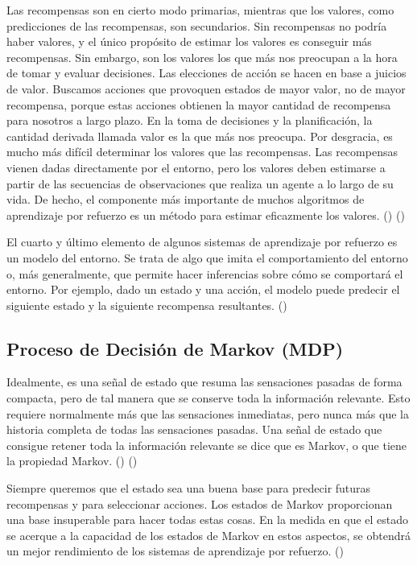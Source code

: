 Las recompensas son en cierto modo primarias, mientras que los valores, como predicciones de las recompensas, son secundarios. Sin recompensas no podría haber valores, y el único propósito de estimar los valores es conseguir más recompensas. Sin embargo, son los valores los que más nos preocupan a la hora de tomar y evaluar decisiones. Las elecciones de acción se hacen en base a juicios de valor. Buscamos acciones que provoquen estados de mayor valor, no de mayor recompensa, porque estas acciones obtienen la mayor cantidad de recompensa para nosotros a largo plazo. En la toma de decisiones y la planificación, la cantidad derivada llamada valor es la que más nos preocupa. Por desgracia, es mucho más difícil determinar los valores que las recompensas. Las recompensas vienen dadas directamente por el entorno, pero los valores deben estimarse a partir de las secuencias de observaciones que realiza un agente a lo largo de su vida. De hecho, el componente más importante de muchos algoritmos de aprendizaje por refuerzo es un método para estimar eficazmente los valores. (\cite{sutton1998introduction}) (\cite{rao2000reinforcement})

El cuarto y último elemento de algunos sistemas de aprendizaje por refuerzo es un modelo del entorno. Se trata de algo que imita el comportamiento del entorno o, más generalmente, que permite hacer inferencias sobre cómo se comportará el entorno. Por ejemplo, dado un estado y una acción, el modelo puede predecir el siguiente estado y la siguiente recompensa resultantes. (\cite{sutton1998introduction})

\subsection{Proceso de Decisión de Markov (MDP)}

Idealmente, es una señal de estado que resuma las sensaciones pasadas de forma compacta, pero de tal manera que se conserve toda la información relevante. Esto requiere normalmente más que las sensaciones inmediatas, pero nunca más que la historia completa de todas las sensaciones pasadas. Una señal de estado que consigue retener toda la información relevante se dice que es Markov, o que tiene la propiedad Markov. (\cite{rao2000reinforcement}) (\cite{wiering2012reinforcement})

Siempre queremos que el estado sea una buena base para predecir futuras recompensas y para seleccionar acciones. Los estados de Markov proporcionan una base insuperable para hacer todas estas cosas. En la medida en que el estado se acerque a la capacidad de los estados de Markov en estos aspectos, se obtendrá un mejor rendimiento de los sistemas de aprendizaje por refuerzo. (\cite{wiering2012reinforcement})

